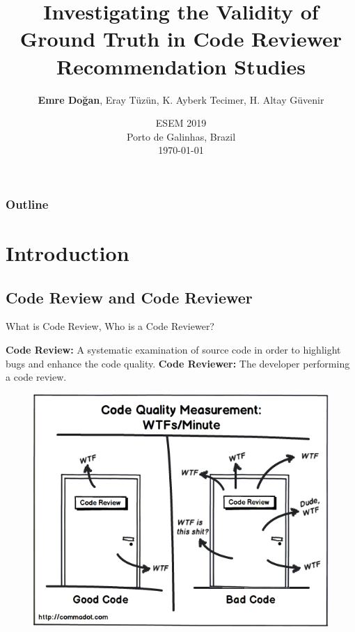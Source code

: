 \documentclass{beamer}
\title{Investigating the Validity of Ground Truth in Code Reviewer Recommendation Studies}
\author[]{\textbf{Emre Doğan}, Eray Tüzün, K. Ayberk Tecimer, H. Altay Güvenir}
\institute{MSc Student \newline Computer Engineering Department \newline Bilkent University}
\date
    {ESEM 2019\\
    Porto de Galinhas, Brazil \\
    \today}
\begin{document}
\begin{frame}
  \titlepage
\end{frame}

\begin{frame}
  \frametitle{Outline}

  \tableofcontents
\end{frame}


\section{Introduction}

\subsection{Code Review and Code Reviewer}

\begin{frame}{\large What is Code Review, Who is a Code Reviewer?}

  \textbf{Code Review:} A systematic examination of source code in order to highlight bugs and enhance the code quality.
  \newline \newline
  \textbf{Code Reviewer:} The developer performing a code review.
  \begin{figure}
    \includegraphics[scale=0.3]{img/code_review_wtf.png}
    \end{figure}
    
  
\end{frame}
\end{document}
